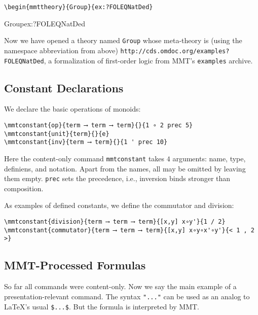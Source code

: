 \documentclass{article}
\begin{document}
\begin{lstlisting}
\begin{mmttheory}{Group}{ex:?FOLEQNatDed}
\end{lstlisting}
\begin{mmttheory}{Group}{ex:?FOLEQNatDed}

Now we have opened a theory named \lstinline|Group| whose meta-theory is (using the namespace abbreviation from above) \lstinline|http://cds.omdoc.org/examples?FOLEQNatDed|, a formalization of first-order logic from MMT's \lstinline|examples| archive.

\subsection{Constant Declarations}

We declare the basic operations of monoids:

\begin{lstlisting}
\mmtconstant{op}{term ⟶ term ⟶ term}{}{1 ∘ 2 prec 5}
\mmtconstant{unit}{term}{}{e}
\mmtconstant{inv}{term ⟶ term}{}{1 ' prec 10}
\end{lstlisting}

Here the content-only command \lstinline|mmtconstant| takes $4$ arguments: name, type, definiens, and notation.
Apart from the names, all may be omitted by leaving them empty.
\lstinline|prec| sets the precedence, i.e., inversion binds stronger than composition.

As examples of defined constants, we define the commutator and division:

\begin{lstlisting}
\mmtconstant{division}{term ⟶ term ⟶ term}{[x,y] x∘y'}{1 / 2}
\mmtconstant{commutator}{term ⟶ term ⟶ term}{[x,y] x∘y∘x'∘y'}{< 1 , 2 >}
\end{lstlisting}

\subsection{MMT-Processed Formulas}

So far all commands were content-only.
Now we say the main example of a presentation-relevant command.
The syntax \lstinline|"..."| can be used as an analog to LaTeX's usual \lstinline|$...$|.
But the formula is interpreted by MMT.


\end{mmttheory}
\end{document}
